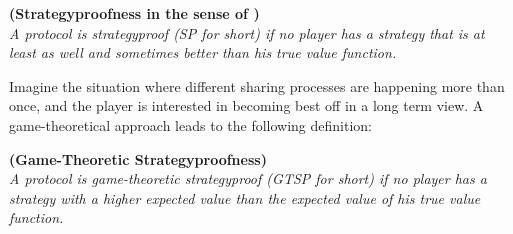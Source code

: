\begin{defi}{\textbf{(Strategyproofness in the sense of \cite{note})}}\\
\emph{A protocol is \emph{strategyproof} (SP for short) if no player has a strategy that is at least as well and sometimes better than his true value function.}
\end{defi}
Imagine the situation where different sharing processes are happening more than once, and the player is interested in becoming best off in a long term view. A game-theoretical approach leads to the following definition:
\begin{defi}{\textbf{(Game-Theoretic Strategyproofness)}}\\
\emph{A protocol is \emph{game-theoretic strategyproof} (GTSP for short) if no player has a strategy with a higher expected value than the expected value of his true value function.}
\end{defi}

